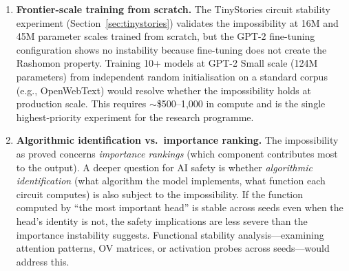 \documentclass[11pt,a4paper]{article}
\begin{document}
\begin{enumerate}[label=(\arabic*)]
    of the quantum instance, and a cross-cutting ``so what'' test)
    identified the following boundary conditions: (1)~the core theorem is
    elementary---a consequence of definitions, not a deep result;
    (2)~every domain instance relabels a known result; (3)~the quantum
    $\eta$ connection is correct but circular (the general POVM case
    relies on an unproven assertion that $\mathrm{span}\{M_i\} = V^G$).
    The ExplanationSystem instance for the Peres-Mermin magic square captures the \emph{structural analogy} between quantum contextuality and explanation instability: both involve two perspectives on the same system that demand incompatible interpretations.  The combinatorial content of the Peres-Mermin theorem (the parity impossibility, verified separately as \texttt{peres\_mermin\_bool} in Lean) is independent of the framework; the framework shows that this content has the same trilemma structure as SHAP instability, Markov equivalence, and codon degeneracy;
    (4)~the $S_n$ prediction for neural networks is falsified (the actual
    symmetry is continuous, not discrete; see
    Section~\ref{sec:cca-spectrum}).  The strongest surviving
    contributions are the invariance counting theorem (bimodal, invariant
    across~$\rho$, novel) and the SAGE algorithm ($R^2 = 0.81$ on
    8~datasets, 6/6 audit tests passed).
  \item \textbf{Frontier-scale training from scratch.}  The TinyStories circuit stability experiment (Section~\ref{sec:tinystories}) validates the impossibility at 16M and 45M parameter scales trained from scratch, but the GPT-2 fine-tuning configuration shows no instability because fine-tuning does not create the Rashomon property.  Training 10+ models at GPT-2 Small scale (124M parameters) from independent random initialisation on a standard corpus (e.g., OpenWebText) would resolve whether the impossibility holds at production scale.  This requires $\sim$\$500--1{,}000 in compute and is the single highest-priority experiment for the research programme.
  \item \textbf{Algorithmic identification vs.\ importance ranking.}  The impossibility as proved concerns \emph{importance rankings} (which component contributes most to the output).  A deeper question for AI safety is whether \emph{algorithmic identification} (what algorithm the model implements, what function each circuit computes) is also subject to the impossibility.  If the function computed by ``the most important head'' is stable across seeds even when the head's identity is not, the safety implications are less severe than the importance instability suggests.  Functional stability analysis---examining attention patterns, OV matrices, or activation probes across seeds---would address this.

\end{enumerate}
\end{document}

